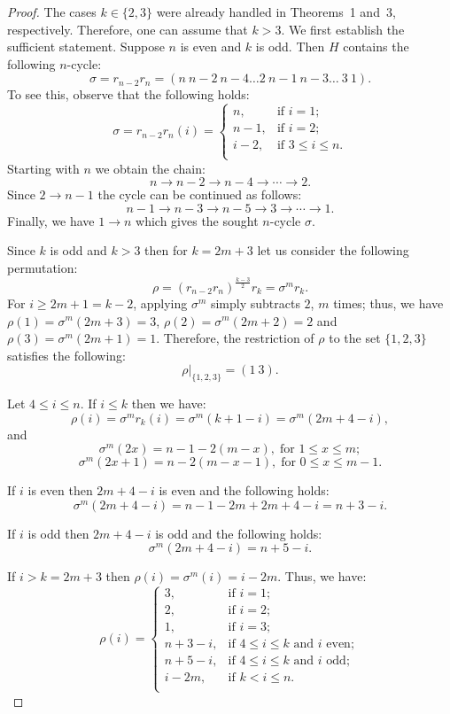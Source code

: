 \documentclass[
final
]{dmtcs-episciences}
\begin{document}
\begin{proof} The cases $k \in \{2, 3\}$ were already handled in Theorems~1 and~3, respectively. Therefore, one can assume that $k>3$. We first establish the sufficient statement. Suppose $n$ is even and $k$ is odd. Then $H$ contains the following $n$-cycle:
$$\sigma = r_{n-2}r_{n}=(n\ n-2\ n-4\dots 2\ n-1\ n-3 \dots \ 3 \  1).$$ 
To see this, observe that the following holds:
\[
\sigma=r_{n-2}r_n(i)=
\begin{cases}
	n, & \text{if }i=1;\\
	n-1, & \text{if }i=2;\\
	i-2, & \text{if }3\leqslant i\leqslant n.\\
\end{cases}
\]
Starting with \(n\) we obtain the chain:
\[
n\rightarrow n-2\rightarrow n-4 \rightarrow\cdots\rightarrow 2.
\]
Since \(2\rightarrow n-1\) the cycle can be continued as follows:
\[
n-1\rightarrow n-3\rightarrow n-5\rightarrow 3 \rightarrow\cdots \rightarrow 1.
\]
Finally, we have \(1\rightarrow n\) which gives the sought $n$-cycle $\sigma$.

Since $k$ is odd and $k > 3$ then for $k=2m+3$ let us consider the following permutation:
\[
\rho  = (r_{n-2}r_n)^{\frac{k-3}{2}}r_k = \sigma^{m}r_k.
\] 
For $i \geqslant 2m+1=k-2$, applying $\sigma^{m}$ simply subtracts $2$, $m$ times; thus, we have $\rho(1) = \sigma^{m}(2m + 3) = 3$, $\rho(2) = \sigma^{m}(2m + 2) = 2$ and $\rho(3) = \sigma^{m}(2m + 1) = 1$.
Therefore, the restriction of $\rho$ to the set $\{1,2,3\}$ satisfies the following: $$\rho\vert_{\{1,2,3\}} = (1\ 3).$$

Let $4 \leqslant i \leqslant n$. If $i \leqslant k$ then we have: 
\[
\rho(i) = \sigma^{m}r_k(i) = \sigma^{m}(k+1-i) = \sigma^{m}(2m+4-i),
\]
and
\[
\sigma^{m}(2x) = n-1-2(m-x), \; \text{for } 1 \leqslant x \leqslant m;
\]
\[
\sigma^{m}(2x+1) = n-2(m-x-1), \; \text{for } 0 \leqslant x \leqslant m-1.
\]

If $i$ is even then $2m+4-i$ is even and the following holds:
\[
\sigma^{m}(2m+4-i) = n-1 - 2m + 2m+4-i = n + 3 - i.
\]

If $i$ is odd then $2m+4-i$ is odd and the following holds:
\[
\sigma^{m}(2m+4-i) = n + 5 - i.     
\]

If $i > k = 2m+3$ then $\rho(i) = \sigma^{m}(i) = i - 2m$. Thus, we have:
\[
\rho(i)=
\begin{cases}
	3, & \text{if }i=1;\\
	2, & \text{if }i=2;\\
	1, & \text{if }i=3;\\
	n+3 - i, & \text{if }4\leqslant i\leqslant k \mbox{ and } i \text{ even};\\
	n+5 - i, & \text{if }4\leqslant i\leqslant k \mbox{ and } i \text{ odd};\\
	i - 2m, & \text{if }k < i\leqslant n.\\
\end{cases}
\]


\end{proof}
\end{document}
